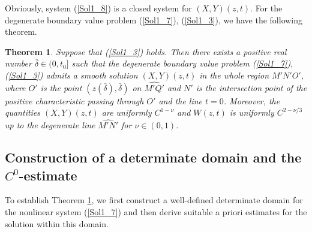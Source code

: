 \documentclass[3p,11pt]{elsarticle}
\numberwithin{equation}{section}
\newtheorem{theorem}{Theorem}[section]
\begin{document}
Obviously, system (\ref{Sol1_8}) is a closed system for $({X},{ Y})(z,t)$. For the degenerate boundary value problem (\ref{Sol1_7}), (\ref{Sol1_3}), we have the following theorem.
\begin{theorem}\label{Sol3_th1}
Suppose that (\ref{Sol1_3}) holds. Then there exists a positive real number $\bar\delta\in(0,t_0]$ such that the degenerate boundary value problem (\ref{Sol1_7}), (\ref{Sol1_3}) admits a smooth solution $({X},{Y})(z,t)$ in the whole region $M'N'O'$, where $O'$ is the point $(z(\bar{\delta}), \bar\delta)$ on $\widehat{M'Q'}$ and $N'$  is the intersection point of the positive characteristic passing through $O'$ and the line $t=0$. Moreover, the quantities $({X},{ Y})(z,t)$ are uniformly $C^{1-\nu}$ and $W(z,t)$ is uniformly $C^{2-\nu/3}$ up to the degenerate line $\widehat{M'N'}$ for $\nu\in(0,1).$
 \end{theorem}

\subsection{Construction of a determinate domain and the $C^0$-estimate}

To establish Theorem \ref{Sol3_th1}, we first construct a well-defined determinate domain for the nonlinear system (\ref{Sol1_7}) and then derive suitable a priori estimates for the solution within this domain.
\end{document}
